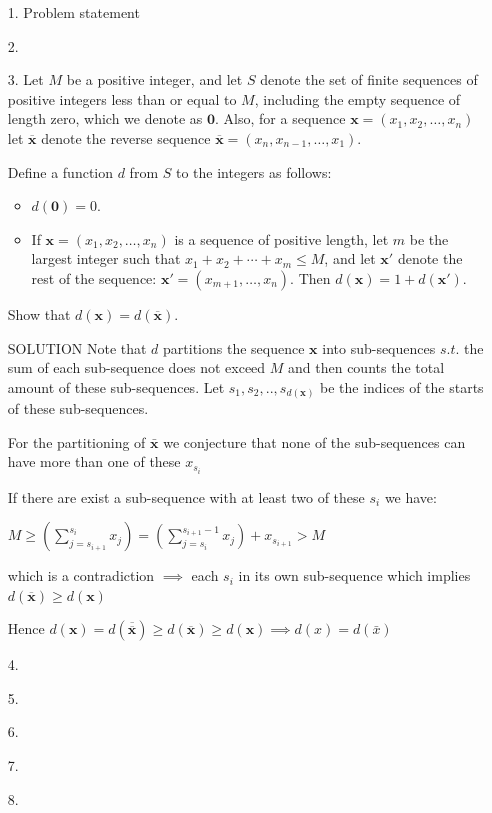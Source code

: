 \documentclass{article}
\begin{document}
\begin{enumerate}

\medskip
\item[1.] %
Problem statement


\medskip
\item[2.]

\medskip
\item[3.] %
Let $M$ be a positive integer, and let $S$ denote the set of finite sequences of positive integers less than or equal to $M$, including the empty sequence of length zero, which we denote as $\mathbf{0}$.
Also, for a sequence $\mathbf{x} = (x_1, x_2, \dotsc, x_n)$ let $\overline{\mathbf{x}}$ denote the reverse sequence $\overline{\mathbf{x}} = (x_n, x_{n-1}, \dotsc, x_1)$.

Define a function $d$ from $S$ to the integers as follows:
\begin{itemize}
\item $d(\mathbf{0}) = 0$.
\item If $\mathbf{x} = (x_1, x_2, \dotsc, x_n)$ is a sequence of positive length, let $m$ be the largest integer such that $x_1 +x_2 +\dotsb +x_m \leq M$, and let $\mathbf{x}'$ denote the rest of the sequence: $\mathbf{x}' = (x_{m+1}, \dotsc, x_n)$.
Then $d(\mathbf{x}) = 1 +d(\mathbf{x}')$.
\end{itemize}
Show that $d(\mathbf{x}) = d(\overline{\mathbf{x}})$.

\medskip
\item[SOLUTION]
Note that $d$ partitions the sequence $\mathbf{x}$ into sub-sequences $s.t.$ the sum of each sub-sequence does not exceed $M$ and then counts the total amount of these sub-sequences. Let ${s_1, s_2, .., s_{d(\mathbf{x})}}$ be the indices of the  starts of these sub-sequences.

For the partitioning of $\bar{\mathbf{x}}$ we conjecture that none of the sub-sequences can have more than one of these $x_{s_i}$

If there are exist a sub-sequence with at least two of these $s_i$ we have:
\begin{center}
    $M \geq (\sum_{j=s_{i+1}}^{s_i} x_j) = (\sum_{j=s_i}^{s_{i+1}-1} x_j) + x_{s_{i+1}} > M$ 
\end{center}
which is a contradiction $\implies$ each $s_i$ in its own sub-sequence which implies $d(\overline{\mathbf{x}}) \geq d(\mathbf{x})$

Hence $d(\mathbf{x}) = d(\overline{\overline{\mathbf{x}}}) \geq d(\overline{\mathbf{x}}) \geq d(\mathbf{x})\implies d(x) = d(\bar x)$


\medskip
\item[4.]


\medskip
\item[5.]


\medskip
\item[6.]


\medskip
\item[7.]


\medskip
\item[8.]


\end{enumerate}
\end{document}
